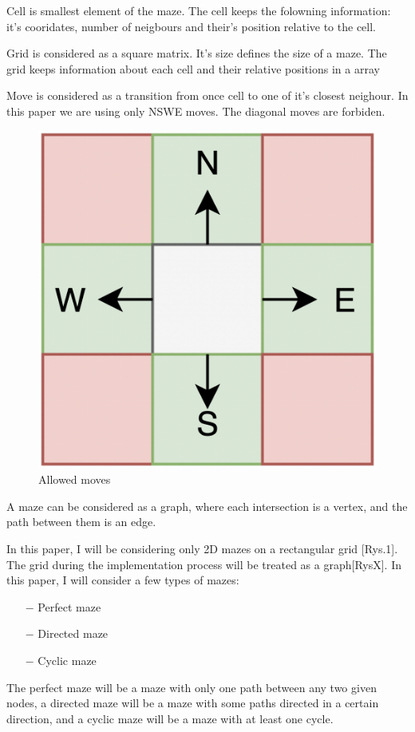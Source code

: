 \begin{definition}
Cell is smallest element of the maze. The cell keeps the folowning information: it's cooridates, number of neigbours and their's position relative to the cell.	
\end{definition}
\begin{definition}
Grid is considered as a square matrix. It's size defines the size of a maze. The grid keeps information about each cell and their relative positions in a array	
\end{definition}
\begin{definition}
Move is considered as a transition from once cell to one of it's closest neighour. In this paper we are using only NSWE moves. The diagonal moves are forbiden.
\begin{figure}
	\centering
	\includegraphics[width=.2\linewidth]{moves}
	\caption{Allowed moves}
\end{figure}		
\end{definition}
\begin{definition}
A maze can be considered as a graph, where each intersection is a vertex, and the path between them is an edge. 
\end{definition}
In this paper, I will be considering only 2D mazes on a rectangular grid [Rys.1]. The grid during the implementation process will be treated as a graph[RysX]. In this paper, I will consider a few types of mazes:
 \begin{itemize}
 \item[$-$] Perfect maze
 \item[$-$] Directed maze
 \item[$-$] Cyclic maze
 \end{itemize}
 The perfect maze will be a maze with only one path between any two given nodes, a directed maze will be a maze with some paths directed in a certain direction, and a cyclic maze will be a maze with at least one cycle. 
